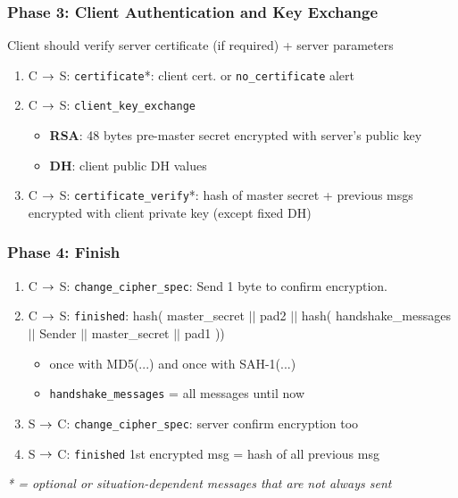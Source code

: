 \documentclass[english, leagacyboxes, nologo]{latex4ei/latex4ei_sheet}
\begin{document}
{    \subsubsection{Phase 3: Client Authentication and Key Exchange}
      Client should verify server certificate (if required) + server parameters
      \begin{enumerate}
          \item C $\rightarrow$ S: \texttt{certificate}*: client cert. or \texttt{no\_certificate} alert
          \item C $\rightarrow$ S: \texttt{client\_key\_exchange}
          \begin{itemize}
            \item \textbf{RSA}: 48 bytes pre-master secret encrypted with server’s public key
            \item \textbf{DH}: client public DH values
          \end{itemize}
          \item C $\rightarrow$ S: \texttt{certificate\_verify}*: hash of master secret + previous msgs encrypted with client private key (except fixed DH)
      \end{enumerate}

    \subsubsection{Phase 4: Finish}
    \begin{enumerate}
      \item C $\rightarrow$ S: \texttt{change\_cipher\_spec}: Send 1 byte to confirm encryption.
      \item C $\rightarrow$ S: \texttt{finished}: hash( master\_secret $||$ pad2 $||$ hash( handshake\_messages $||$ Sender $||$ master\_secret $||$ pad1 ))
      \begin{itemize}
        \item once with MD5(...) and once with SAH-1(...)
        \item \texttt{handshake\_messages} = all messages until now
      \end{itemize}
      \item S $\rightarrow$ C: \texttt{change\_cipher\_spec}: server confirm encryption too
      \item S $\rightarrow$ C: \texttt{finished} 1st encrypted msg = hash of all previous msg
    \end{enumerate}

  \textit{* = optional or situation-dependent messages that are not always sent}
  }
\end{document}
